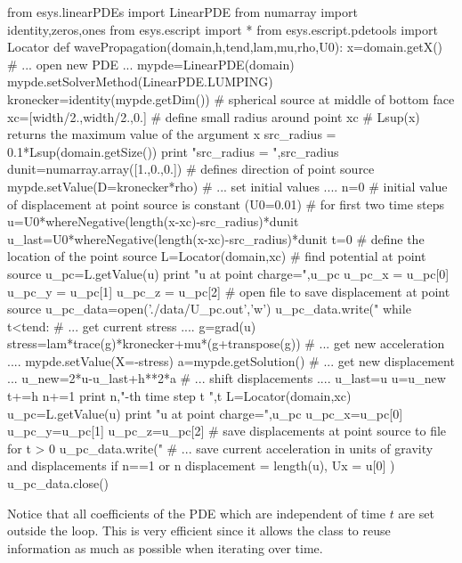 \begin{python}
from esys.linearPDEs import LinearPDE
from numarray import identity,zeros,ones
from esys.escript import *
from esys.escript.pdetools import Locator
def wavePropagation(domain,h,tend,lam,mu,rho,U0):
   x=domain.getX()
   # ... open new PDE ...
   mypde=LinearPDE(domain)
   mypde.setSolverMethod(LinearPDE.LUMPING)
   kronecker=identity(mypde.getDim())
   #  spherical source at middle of bottom face
   xc=[width/2.,width/2.,0.] 
   # define small radius around point xc
   # Lsup(x) returns the maximum value of the argument x
   src_radius = 0.1*Lsup(domain.getSize())
   print "src_radius = ",src_radius
   dunit=numarray.array([1.,0.,0.]) # defines direction of point source
   mypde.setValue(D=kronecker*rho)
   # ... set initial values ....
   n=0
   # initial value of displacement at point source is constant (U0=0.01)
   # for first two time steps
   u=U0*whereNegative(length(x-xc)-src_radius)*dunit
   u_last=U0*whereNegative(length(x-xc)-src_radius)*dunit
   t=0
   # define the location of the point source
   L=Locator(domain,xc)
   # find potential at point source
   u_pc=L.getValue(u)
   print "u at point charge=",u_pc
   u_pc_x = u_pc[0]
   u_pc_y = u_pc[1]
   u_pc_z = u_pc[2]
   # open file to save displacement at point source
   u_pc_data=open('./data/U_pc.out','w')
   u_pc_data.write("%
   while t<tend:
     # ... get current stress ....
     g=grad(u)
     stress=lam*trace(g)*kronecker+mu*(g+transpose(g))
     # ... get new acceleration ....
     mypde.setValue(X=-stress)
     a=mypde.getSolution()
     # ... get new displacement ...
     u_new=2*u-u_last+h**2*a
     # ... shift displacements ....
     u_last=u
     u=u_new
     t+=h
     n+=1
     print n,"-th time step t ",t
     L=Locator(domain,xc)
     u_pc=L.getValue(u)
     print "u at point charge=",u_pc
     u_pc_x=u_pc[0]
     u_pc_y=u_pc[1]
     u_pc_z=u_pc[2]
     # save displacements at point source to file for t > 0
     u_pc_data.write("%
     # ... save current acceleration in units of gravity and displacements
     if n==1 or n%
     displacement = length(u), Ux = u[0] )
   u_pc_data.close()
\end{python}
Notice that 
all coefficients of the PDE which are independent of time $t$ are set outside the  
loop. This is very efficient since it allows the \LinearPDE class to reuse information as much as possible 
when iterating over time.  
 
